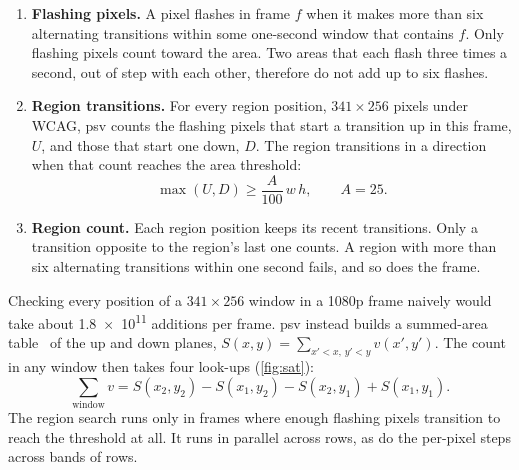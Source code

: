 \documentclass[11pt,a4paper]{article}
\newcommand{\psv}{\textsf{psv}}
\begin{document}
\begin{enumerate}
  \item \textbf{Flashing pixels.} A pixel flashes in frame $f$ when it makes more than six alternating transitions within some one-second window that contains $f$. Only flashing pixels count toward the area. Two areas that each flash three times a second, out of step with each other, therefore do not add up to six flashes.
  \item \textbf{Region transitions.} For every region position, $341\times256$ pixels under WCAG, \psv{} counts the flashing pixels that start a transition up in this frame, $U$, and those that start one down, $D$. The region transitions in a direction when that count reaches the area threshold:
  \begin{equation}
    \max(U, D) \ge \frac{A}{100}\,w\,h, \qquad A = 25 .
  \end{equation}
  \item \textbf{Region count.} Each region position keeps its recent transitions. Only a transition opposite to the region's last one counts. A region with more than six alternating transitions within one second fails, and so does the frame.
\end{enumerate}

Checking every position of a $341\times256$ window in a 1080p frame naively would take about \num{1.8e11} additions per frame. \psv{} instead builds a summed-area table~\cite{crow1984} of the up and down planes, $S(x,y)=\sum_{x'<x,\,y'<y} v(x',y')$. The count in any window then takes four look-ups (\cref{fig:sat}):
\begin{equation}
  \sum_{\text{window}} v = S(x_2,y_2) - S(x_1,y_2) - S(x_2,y_1) + S(x_1,y_1).
\end{equation}
The region search runs only in frames where enough flashing pixels transition to reach the threshold at all. It runs in parallel across rows, as do the per-pixel steps across bands of rows.
\end{document}
